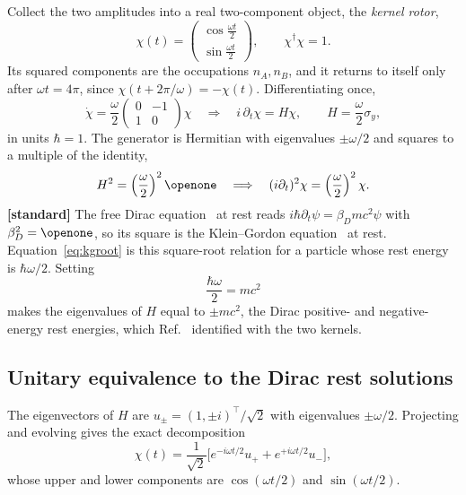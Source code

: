 \documentclass[%
 reprint, amsmath,amssymb, aps, prb, ]{revtex4-2}
\numberwithin{equation}{section}
\begin{document}
Collect the two amplitudes into a real two-component object, the \emph{kernel rotor},
\begin{equation}
\chi(t)=\begin{pmatrix}\cos\tfrac{\omega t}{2}\\[3pt]\sin\tfrac{\omega t}{2}\end{pmatrix},\qquad \chi^\dagger\chi=1 .
\label{eq:rotor}
\end{equation}
Its squared components are the occupations $n_A,n_B$, and it returns to itself only after $\omega t=4\pi$, since $\chi(t+2\pi/\omega)=-\chi(t)$. Differentiating once,
\begin{equation}
\dot\chi=\frac{\omega}{2}\begin{pmatrix}0&-1\\1&0\end{pmatrix}\chi
\quad\Longrightarrow\quad
i\,\partial_t\chi=H\chi,\qquad H=\frac{\omega}{2}\sigma_y ,
\label{eq:foe}
\end{equation}
in units $\hbar=1$. The generator is Hermitian with eigenvalues $\pm\omega/2$ and squares to a multiple of the identity,
\begin{equation}
H^2=\left(\frac{\omega}{2}\right)^{2}\openone \quad\Longrightarrow\quad (i\partial_t)^2\chi=\left(\frac{\omega}{2}\right)^{2}\chi .
\label{eq:kgroot}
\end{equation}
\textbf{[standard]} The free Dirac equation~\cite{ref:dirac28} at rest reads $i\hbar\partial_t\psi=\beta_D mc^2\psi$ with $\beta_D^2=\openone$, so its square is the Klein--Gordon equation~\cite{ref:klein,ref:gordon26} at rest. Equation~\eqref{eq:kgroot} is this square-root relation for a particle whose rest energy is $\hbar\omega/2$. Setting
\begin{equation}
\frac{\hbar\omega}{2}=mc^2
\label{eq:idmass}
\end{equation}
makes the eigenvalues of $H$ equal to $\pm mc^2$, the Dirac positive- and negative-energy rest energies, which Ref.~\cite{ref:p7} identified with the two kernels.

\subsection{Unitary equivalence to the Dirac rest solutions}

The eigenvectors of $H$ are $u_\pm=(1,\pm i)^\top/\sqrt2$ with eigenvalues $\pm\omega/2$. Projecting and evolving gives the exact decomposition
\begin{equation}
\chi(t)=\frac{1}{\sqrt2}\Big[e^{-i\omega t/2}u_{+}+e^{+i\omega t/2}u_{-}\Big],
\label{eq:decomp}
\end{equation}
whose upper and lower components are $\cos(\omega t/2)$ and $\sin(\omega t/2)$.
\end{document}
